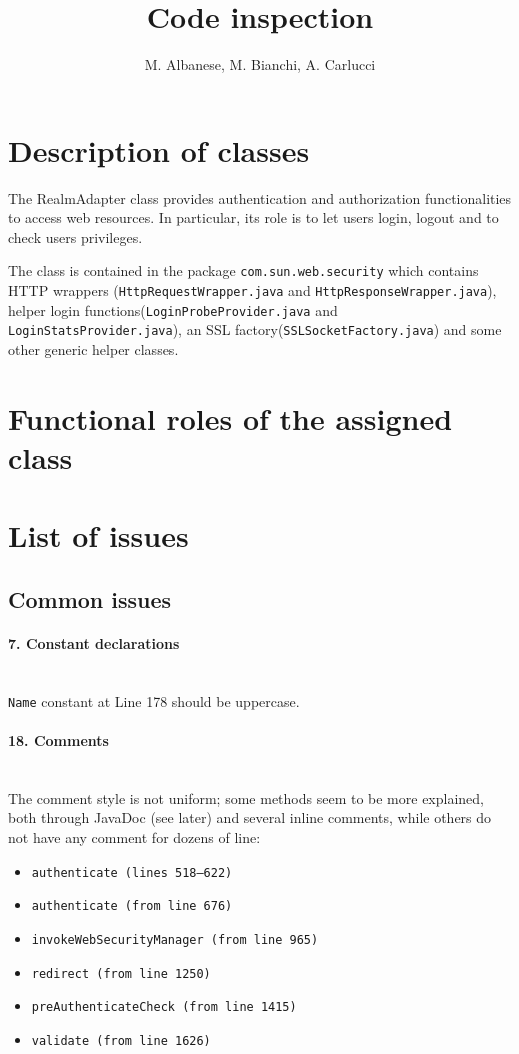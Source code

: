 \documentclass[english]{article}
\newcommand{\code}[1]{\texttt{#1}}
\newcommand{\issue}[3][?]{
    \paragraph{#1. #2} \mbox{}\\ #3
}
\begin{document}
\title{Code inspection}


\author{M. Albanese, M. Bianchi, A. Carlucci}

\maketitle
\tableofcontents{}

\newpage{}


\section{Description of classes}

The RealmAdapter class provides authentication and authorization functionalities
to access web resources. In particular, its role is to let users login,
logout and to check users privileges.

The class is contained in the package \code{com.sun.web.security} which contains
HTTP wrappers (\code{HttpRequestWrapper.java} and \code{HttpResponseWrapper.java}), 
helper login functions(\code{LoginProbeProvider.java} and \code{LoginStatsProvider.java}), 
an SSL factory(\code{SSLSocketFactory.java}) and some other generic helper classes.

\section{Functional roles of the assigned class}

\section{List of issues}
\subsection{Common issues} %
\issue[7]{Constant declarations}{
    \code{Name} constant at Line 178 should be uppercase.
}

\issue[18]{Comments} {
The comment style is not uniform; some methods seem to be more explained, 
both through JavaDoc (see later) and several inline comments, while others 
do not have any comment for dozens of line:
\begin{itemize}
\item \code{authenticate (lines 518--622)} 
\item \code{authenticate (from line 676)} 
\item \code{invokeWebSecurityManager (from line 965)} 
\item \code{redirect (from line 1250)} 
\item \code{preAuthenticateCheck (from line 1415)} 
\item \code{validate (from line 1626)} 
\end{itemize}
}
\end{document}
